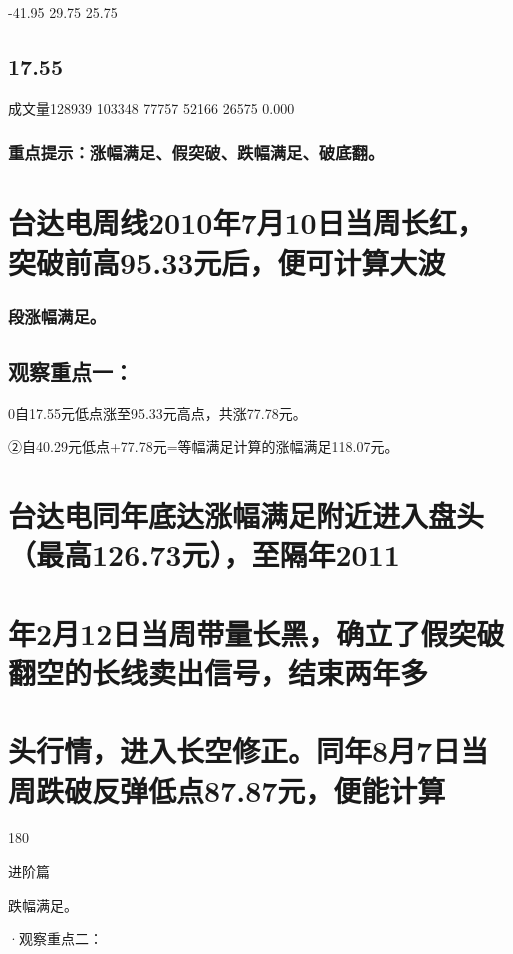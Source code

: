 \documentclass{article}
\begin{document}
-41.95 29.75 25.75

\subsection{17.55}

成文量128939 103348 77757 52166 26575 0.000

\subsubsection{重点提示：涨幅满足、假突破、跌幅满足、破底翻。}

\section{台达电周线2010年7月10日当周长红，突破前高95.33元后，便可计算大波}

\subsubsection{段涨幅满足。}

\subsection{观察重点一：}

0自17.55元低点涨至95.33元高点，共涨77.78元。

②自40.29元低点+77.78元=等幅满足计算的涨幅满足118.07元。

\section{台达电同年底达涨幅满足附近进入盘头（最高126.73元），至隔年2011}

\section{年2月12日当周带量长黑，确立了假突破翻空的长线卖出信号，结束两年多}

\section{头行情，进入长空修正。同年8月7日当周跌破反弹低点87.87元，便能计算}

180

\clearpage

进阶篇

跌幅满足。

·观察重点二：
\end{document}
